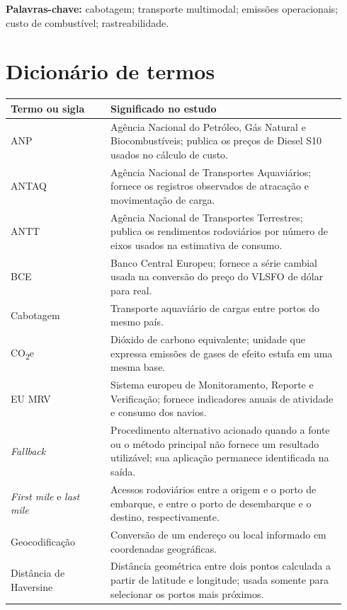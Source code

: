 \documentclass[brazil,]{article}
\let\oldsection\section
\renewcommand{\section}{\Needspace{14\baselineskip}\oldsection}
\begin{document}
\noindent\textbf{Palavras-chave:} cabotagem; transporte multimodal; emissões
operacionais; custo de combustível; rastreabilidade.

\clearpage

\tableofcontents
\clearpage

\section*{Dicionário de termos}

\begin{longtable}{@{}p{0.28\linewidth}p{0.66\linewidth}@{}}
\toprule
\textbf{Termo ou sigla} & \textbf{Significado no estudo} \\
\midrule
\endhead
ANP & Agência Nacional do Petróleo, Gás Natural e Biocombustíveis; publica os preços de Diesel S10 usados no cálculo de custo. \\
ANTAQ & Agência Nacional de Transportes Aquaviários; fornece os registros observados de atracação e movimentação de carga. \\
ANTT & Agência Nacional de Transportes Terrestres; publica os rendimentos rodoviários por número de eixos usados na estimativa de consumo. \\
BCE & Banco Central Europeu; fornece a série cambial usada na conversão do preço do VLSFO de dólar para real. \\
Cabotagem & Transporte aquaviário de cargas entre portos do mesmo país. \\
CO\textsubscript{2}e & Dióxido de carbono equivalente; unidade que expressa emissões de gases de efeito estufa em uma mesma base. \\
EU MRV & Sistema europeu de Monitoramento, Reporte e Verificação; fornece indicadores anuais de atividade e consumo dos navios. \\
\textit{Fallback} & Procedimento alternativo acionado quando a fonte ou o método principal não fornece um resultado utilizável; sua aplicação permanece identificada na saída. \\
\textit{First mile} e \textit{last mile} & Acessos rodoviários entre a origem e o porto de embarque, e entre o porto de desembarque e o destino, respectivamente. \\
Geocodificação & Conversão de um endereço ou local informado em coordenadas geográficas. \\
Distância de Haversine & Distância geométrica entre dois pontos calculada a partir de latitude e longitude; usada somente para selecionar os portos mais próximos. \\

\end{longtable}
\end{document}
